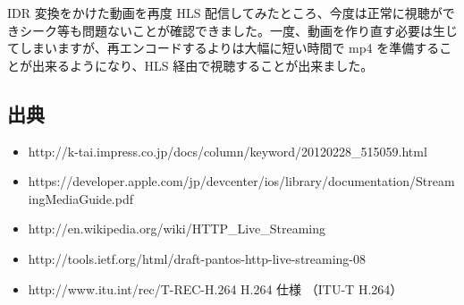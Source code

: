  IDR 変換をかけた動画を再度 HLS 配信してみたところ、今度は正常に視聴ができシーク等も問題ないことが確認できました。一度、動画を作り直す必要は生じてしまいますが、再エンコードするよりは大幅に短い時間で mp4 を準備することが出来るようになり、HLS 経由で視聴することが出来ました。

\subsection{出典}
\begin{itemize}
\item http://k-tai.impress.co.jp/docs/column/keyword/20120228\_515059.html
\item https://developer.apple.com/jp/devcenter/ios/library/documentation/StreamingMediaGuide.pdf
\item http://en.wikipedia.org/wiki/HTTP\_Live\_Streaming
\item http://tools.ietf.org/html/draft-pantos-http-live-streaming-08
\item http://www.itu.int/rec/T-REC-H.264 H.264 仕様 （ITU-T H.264）
\end{itemize}
